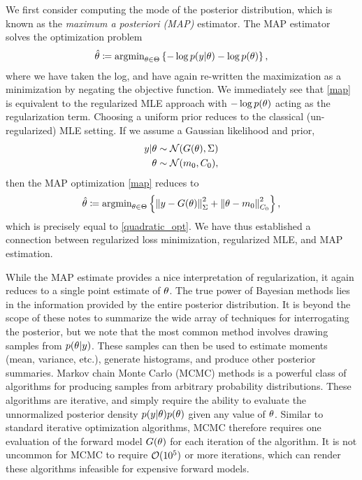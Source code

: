 \documentclass[12pt]{article}
\begin{document}
We first consider computing the mode of the posterior distribution, which is known as the 
\textit{maximum a posteriori (MAP)} estimator. The MAP estimator solves the optimization problem 
\begin{align}
\hat{\theta} \coloneqq \text{argmin}_{\theta \in \Theta} \left\{-\log p(y | \theta) - \log p(\theta) \right\}, \label{map}
\end{align}
where we have taken the log, and have again re-written the maximization as a minimization by negating the objective function. 
We immediately see that \ref{map} is equivalent to the regularized MLE approach with $-\log p(\theta)$ acting as the regularization term.
Choosing a uniform prior reduces to the classical (un-regularized) MLE setting. If we assume a Gaussian likelihood and prior, 
\begin{align*}
y | \theta &\sim \mathcal{N}(G(\theta), \Sigma) \\
\theta &\sim \mathcal{N}(m_0, C_0), 
\end{align*} 
then the MAP optimization \ref{map} reduces to 
\begin{align}
\hat{\theta} \coloneqq \text{argmin}_{\theta \in \Theta} \left\{\left\lVert y - G(\theta)\right\rVert^2_{\Sigma} + \left\lVert\theta - m_0\right\rVert_{C_0}^2\right\}, 
\end{align}
which is precisely equal to \ref{quadratic_opt}. We have thus established a connection between regularized loss minimization, regularized 
MLE, and MAP estimation. 

While the MAP estimate provides a nice interpretation of regularization, it again reduces to a single point estimate of $\theta$. The true 
power of Bayesian methods lies in the information provided by the entire posterior distribution. It is beyond the scope of these notes to 
summarize the wide array of techniques for interrogating the posterior, but we note that the most common method involves drawing 
samples from $p(\theta | y)$. These samples can then be used to estimate moments (mean, variance, etc.), generate histograms, 
and produce other posterior summaries. Markov chain Monte Carlo (MCMC) methods is a powerful class of algorithms for producing 
samples from arbitrary probability distributions. These algorithms are iterative, and simply require the ability to evaluate the 
unnormalized posterior density $p(y | \theta) p(\theta)$ given any value of $\theta$. Similar to standard iterative optimization algorithms, 
MCMC therefore requires one evaluation of the forward model $G(\theta)$ for each iteration of the algorithm. It is not uncommon for 
MCMC to require $\mathcal{O}(10^5)$ or more iterations, which can render these algorithms infeasible for expensive forward models. 
\end{document}
